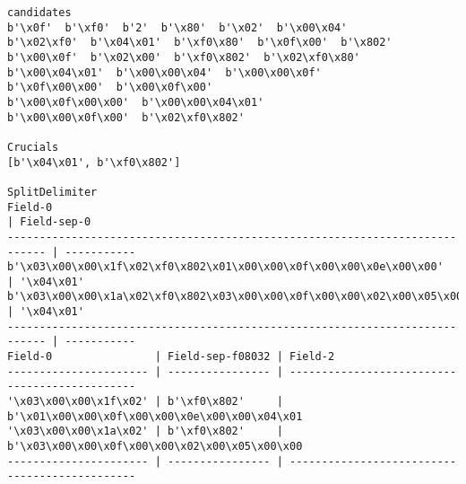 \begin{verbatim}
candidates
b'\x0f'  b'\xf0'  b'2'  b'\x80'  b'\x02'  b'\x00\x04'  
b'\x02\xf0'  b'\x04\x01'  b'\xf0\x80'  b'\x0f\x00'  b'\x802'
b'\x00\x0f'  b'\x02\x00'  b'\xf0\x802'  b'\x02\xf0\x80'
b'\x00\x04\x01'  b'\x00\x00\x04'  b'\x00\x00\x0f'
b'\x0f\x00\x00'  b'\x00\x0f\x00'
b'\x00\x0f\x00\x00'  b'\x00\x00\x04\x01'
b'\x00\x00\x0f\x00'  b'\x02\xf0\x802'

Crucials
[b'\x04\x01', b'\xf0\x802']

SplitDelimiter
Field-0                                                                      | Field-sep-0
---------------------------------------------------------------------------- | -----------
b'\x03\x00\x00\x1f\x02\xf0\x802\x01\x00\x00\x0f\x00\x00\x0e\x00\x00'         | '\x04\x01' 
b'\x03\x00\x00\x1a\x02\xf0\x802\x03\x00\x00\x0f\x00\x00\x02\x00\x05\x00\x00' | '\x04\x01' 
---------------------------------------------------------------------------- | -----------
Field-0                | Field-sep-f08032 | Field-2                                       
---------------------- | ---------------- | ----------------------------------------------
'\x03\x00\x00\x1f\x02' | b'\xf0\x802'     | b'\x01\x00\x00\x0f\x00\x00\x0e\x00\x00\x04\x01
'\x03\x00\x00\x1a\x02' | b'\xf0\x802'     | b'\x03\x00\x00\x0f\x00\x00\x02\x00\x05\x00\x00
---------------------- | ---------------- | ----------------------------------------------
\end{verbatim}
